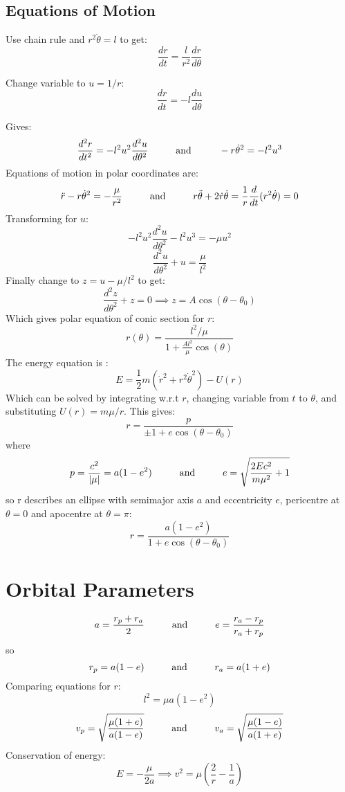 \documentclass[table,cmyk]{article}
\begin{document}
\begin{longtable}
\subsection*{Equations of Motion}
Use chain rule and $r^2\dot{\theta} = l$ to get:
\[\frac{dr}{dt} = \frac{l}{r^2}\frac{dr}{d\theta}\]

Change variable to $u = 1/r$:
\[\frac{dr}{dt} = -l \frac{du}{d\theta}\]

Gives:
\[\frac{d^2r}{dt^2} = -l^2u^2\frac{d^2u}{d\theta^2}\text{\hspace{1cm}and\hspace{1cm}} -r\dot{\theta}^2 = -l^2u^3\]
Equations of motion in polar coordinates are:
\[\ddot{r} - r\dot{\theta}^2 = -\frac{\mu}{r^2}\text{\hspace{1cm}and\hspace{1cm}}r\ddot{\theta}+2\dot{r}\dot{\theta} = \frac{1}{r}\frac{d}{dt}(r^2\dot{\theta})=0\]
Transforming for $u$:
\[-l^2u^2\frac{d^2u}{d\theta^2}-l^2u^3 = -\mu u^2\]
\[\frac{d^2u}{d\theta^2}+u = \frac{\mu}{l^2}\]
Finally change to $z = u-\mu/l^2$ to get:
\[\frac{d^2z}{d\theta^2}+z = 0 \implies z = A\cos(\theta-\theta_0)\]
Which gives polar equation of conic section for $r$:
\[r(\theta) = \frac{l^2/\mu}{1+\frac{Al^2}{\mu}\cos(\theta)}\]
The energy equation is :
\[E = \frac{1}{2}m(\dot{r}^2+r^2\dot{\theta}^2)-U(r)\]
Which can be solved by integrating w.r.t $r$, changing variable from $t$ to $\theta$, and substituting $U(r) = m\mu/r$. This gives:
\[r = \frac{p}{\pm1+e\cos(\theta-\theta_0)}\]
where
\[p = \frac{c^2}{|\mu|}=a(1-e^2)\text{\hspace{1cm}and\hspace{1cm}}e = \sqrt{\frac{2Ec^2}{m\mu^2}+1}\]
so r describes an ellipse with semimajor axis $a$ and eccentricity $e$, pericentre at $\theta=0$ and apocentre at $\theta=\pi$:
\[r = \frac{a(1-e^2)}{1+e\cos(\theta-\theta_0)}\]



\vspace{4cm}


\tabularnewline\hline
\section*{Orbital Parameters}
\[a=\frac{r_p+r_a}{2}\text{\hspace{1cm}and\hspace{1cm}}e=\frac{r_a-r_p}{r_a+r_p}\]
so
\[r_p=a(1-e)\text{\hspace{1cm}and\hspace{1cm}}r_a=a(1+e)\]
Comparing equations for $r$:
\[l^2 = \mu a(1-e^2)\]
\[v_p = \sqrt{\frac{\mu(1+e)}{a(1-e)}}\text{\hspace{1cm}and\hspace{1cm}}v_a = \sqrt{\frac{\mu(1-e)}{a(1+e)}}\]
Conservation of energy:
\[E = -\frac{\mu}{2a} \implies v^2 = \mu\left(\frac{2}{r}-\frac{1}{a}\right)\]

\end{longtable}
\end{document}
